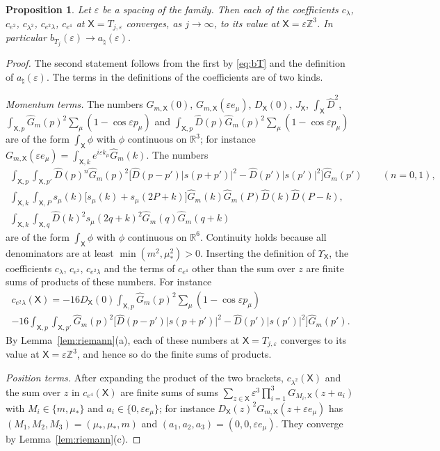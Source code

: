 \documentclass[11pt]{amsart}
\theoremstyle{plain}
\newtheorem{proposition}[theorem]{Proposition}
\theoremstyle{definition}
\theoremstyle{remark}
\numberwithin{equation}{section}
\newcommand{\R}{\mathbb{R}}
\newcommand{\Z}{\mathbb{Z}}
\newcommand{\eps}{\varepsilon}
\newcommand{\abs}[1]{\lvert #1\rvert}
\begin{document}
\begin{proposition}\label{prop:Hct}
Let $\eps$ be a spacing of the family. Then each of the coefficients $c_\lambda$, $c_{e^2}$, $c_{\lambda^2}$, $c_{e^2\lambda}$, $c_{e^4}$ at $\mathsf X=T_{j,\eps}$ converges, as $j\to\infty$, to its value at $\mathsf X=\eps\Z^3$. In particular $b_{T_j}(\eps)\to a_\natural(\eps)$.
\end{proposition}

\begin{proof}
The second statement follows from the first by \eqref{eq:bT} and the definition of $a_\natural(\eps)$. The terms in the definitions of the coefficients are of two kinds.

\emph{Momentum terms.} The numbers $G_{m,\mathsf X}(0)$, $G_{m,\mathsf X}(\eps e_\mu)$, $D_{\mathsf X}(0)$, $J_{\mathsf X}$, $\int_{\mathsf X}\hat D^2$, $\int_{\mathsf X,p}\hat G_m(p)^2\sum_\mu(1-\cos\eps p_\mu)$ and $\int_{\mathsf X,p}\hat D(p)\hat G_m(p)^2\sum_\mu(1-\cos\eps p_\mu)$ are of the form $\int_{\mathsf X}\phi$ with $\phi$ continuous on $\R^3$; for instance $G_{m,\mathsf X}(\eps e_\mu)=\int_{\mathsf X,k}e^{i\eps k_\mu}\hat G_m(k)$. The numbers
\begin{gather*}
\int_{\mathsf X,p}\int_{\mathsf X,p'}\hat D(p)^n\hat G_m(p)^2\Big[\hat D(p-p')\abs{s(p+p')}^2-\hat D(p')\abs{s(p')}^2\Big]\hat G_m(p')\qquad(n=0,1),\\
\int_{\mathsf X,k}\int_{\mathsf X,P}s_\mu(k)\big[s_\mu(k)+s_\mu(2P+k)\big]\hat G_m(k)\hat G_m(P)\hat D(k)\hat D(P-k),\\
\int_{\mathsf X,k}\int_{\mathsf X,q}\hat D(k)^2s_\mu(2q+k)^2\hat G_m(q)\hat G_m(q+k)
\end{gather*}
are of the form $\int_{\mathsf X}\phi$ with $\phi$ continuous on $\R^6$. Continuity holds because all denominators are at least $\min(m^2,\mu_*^2)>0$. Inserting the definition of $\Upsilon_{\mathsf X}$, the coefficients $c_\lambda$, $c_{e^2}$, $c_{e^2\lambda}$ and the terms of $c_{e^4}$ other than the sum over $z$ are finite sums of products of these numbers. For instance
\begin{multline*}
c_{e^2\lambda}(\mathsf X)=-16D_{\mathsf X}(0)\int_{\mathsf X,p}\hat G_m(p)^2\sum_\mu(1-\cos\eps p_\mu)\\
-16\int_{\mathsf X,p}\int_{\mathsf X,p'}\hat G_m(p)^2\Big[\hat D(p-p')\abs{s(p+p')}^2-\hat D(p')\abs{s(p')}^2\Big]\hat G_m(p').
\end{multline*}
By Lemma~\ref{lem:riemann}(a), each of these numbers at $\mathsf X=T_{j,\eps}$ converges to its value at $\mathsf X=\eps\Z^3$, and hence so do the finite sums of products.

\emph{Position terms.} After expanding the product of the two brackets, $c_{\lambda^2}(\mathsf X)$ and the sum over $z$ in $c_{e^4}(\mathsf X)$ are finite sums of sums $\sum_{z\in\mathsf X}\eps^3\prod_{i=1}^3G_{M_i,\mathsf X}(z+a_i)$ with $M_i\in\{m,\mu_*\}$ and $a_i\in\{0,\eps e_\mu\}$; for instance $D_{\mathsf X}(z)^2G_{m,\mathsf X}(z+\eps e_\mu)$ has $(M_1,M_2,M_3)=(\mu_*,\mu_*,m)$ and $(a_1,a_2,a_3)=(0,0,\eps e_\mu)$. They converge by Lemma~\ref{lem:riemann}(c).
\end{proof}
\end{document}
